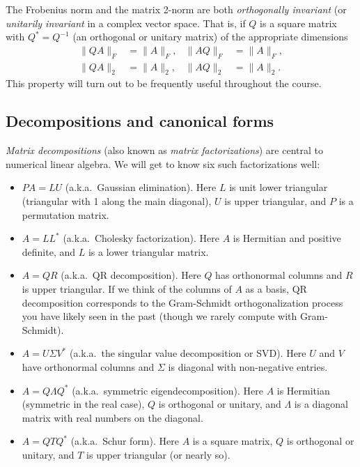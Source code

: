 \documentclass[12pt, leqno]{article} %
\begin{document}
The Frobenius norm and the matrix 2-norm are both {\em orthogonally
  invariant} (or {\em unitarily invariant} in a complex vector space.
That is, if $Q$ is a square matrix with $Q^* = Q^{-1}$ (an orthogonal
or unitary matrix) of the appropriate dimensions
\begin{align*}
  \|QA\|_F &= \|A\|_F, &
  \|AQ\|_F &= \|A\|_F, \\
  \|QA\|_2 &= \|A\|_2, &
  \|AQ\|_2 &= \|A\|_2.
\end{align*}
This property will turn out to be frequently useful throughout the course.

\subsection{Decompositions and canonical forms}

{\em Matrix decompositions} (also known as
{\em matrix factorizations}) are central to numerical linear algebra.
We will get to know six such factorizations well:
\begin{itemize}
\item
  $PA = LU$ (a.k.a.~Gaussian elimination).  Here $L$ is unit lower
  triangular (triangular with 1 along the main diagonal), $U$ is upper
  triangular, and $P$ is a permutation matrix.
\item
  $A = LL^*$ (a.k.a.~Cholesky factorization).  Here $A$ is Hermitian
  and positive definite, and $L$ is a lower triangular matrix.
\item
  $A = QR$ (a.k.a.~QR decomposition).  Here $Q$ has orthonormal
  columns and $R$ is upper triangular.  If we think of the columns
  of $A$ as a basis, QR decomposition corresponds to the Gram-Schmidt
  orthogonalization process you have likely seen in the past (though
  we rarely compute with Gram-Schmidt).
\item
  $A = U \Sigma V^*$ (a.k.a.~the singular value decomposition or SVD).
  Here $U$ and $V$ have orthonormal columns and $\Sigma$ is diagonal
  with non-negative entries.
\item
  $A = Q \Lambda Q^*$ (a.k.a.~symmetric eigendecomposition).  Here $A$
  is Hermitian (symmetric in the real case), $Q$ is orthogonal or
  unitary, and $\Lambda$ is a diagonal matrix with real numbers on the
  diagonal.
\item
  $A = QTQ^*$ (a.k.a.~Schur form).  Here $A$ is a square matrix, $Q$
  is orthogonal or unitary, and $T$ is upper triangular (or nearly
  so).
\end{itemize}
\end{document}
